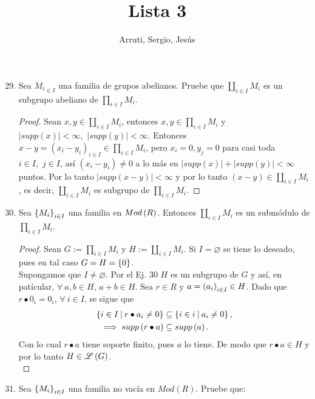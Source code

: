 \documentclass{article}
\title{Lista 3}
\author{Arruti, Sergio, Jesús}
\date{}
\begin{document}
	\maketitle
	\begin{enumerate}[label=\textbf{Ej \arabic*.}]
		\setcounter{enumi}{28}
		
		
		\item Sea ${M_i}_{\in I}$ una familia de grupos abelianos. Pruebe que $\displaystyle\coprod_{i\in I}M_i$ 
		es un subgrupo abeliano de $\displaystyle\prod_{i\in I}M_i$.\\
		
		\begin{proof}
			Sean $x,y\in \displaystyle\coprod_{i\in I}M_i$, entonces $x,y\in \displaystyle\prod_{i\in I}M_i$ y\\ $|supp(x)|<\infty,\,\, |supp(y)|<\infty$. 
			Entonces $x-y=(x_i-y_i)_{i\in I}\in \displaystyle\prod_{i\in I}M_i$, pero $x_i=0, y_j=0$ para casi toda $i\in I,\,\,j\in I$, así $(x_i-y_i)\neq 0$ a lo más en
			$|supp(x)|+|supp(y)|<\infty$ puntos. Por lo tanto $|supp(x-y)|<\infty$ y por lo tanto $(x-y)\in \displaystyle\coprod_{i\in I}M_i$, es decir,
			$\displaystyle\coprod_{i\in I}M_i$ es subgrupo de $\displaystyle\prod_{i\in I}M_i$.
			
		\end{proof}		
		
		\item Sea ${\left\{{M}_{i}\right\}}_{i\in I}$ una familia en $Mod\left(R\right)$. Entonces $\coprod_{i\in I}M_i$ es un submódulo de $\prod_{i\in I}M_i$.
		\begin{proof}
			Sean $G:=\prod_{i\in I}M_i$ y $H:=\coprod_{i\in I}M_i$. Si $I=\varnothing$ se tiene lo deseado, pues  en tal caso $G=H=\left\{0\right\}$.\\
			Supongamos que $I\neq\varnothing$.
			Por el Ej. 30 $H$ es un subgrupo de $G$ y así, en patícular, $\forall\ a,b\in H$, $a+b\in H$. Sea $r\in R$ y $a={\left({a}_{i}\right)}_{i\in I}\in H$. Dado que $r\bullet 0_i=0_i$, $\forall\ i\in I$, se sigue que
			\begin{align*}
				\descset{i}{I}{r\bullet a_i\neq 0}&\subseteq\descset{i}{i}{a_i\neq 0},\\
				\implies supp\lrprth{r\bullet a}&\subseteq supp\lrprth{a}.
			\end{align*} 
			Con lo cual $r\bullet a$ tiene soporte finito, pues $a$ lo tiene. De modo que $r\bullet a\in H$ y por lo tanto $H\in\mathscr{L}\left(G\right)$.\\
		\end{proof}
		\item Sea ${\left\{{M}_{i}\right\}}_{i\in I}$ una familia no vacía en $Mod(R)$. Pruebe que:
		\begin{enumerate}
			

\end{enumerate}
\end{enumerate}
\end{document}
